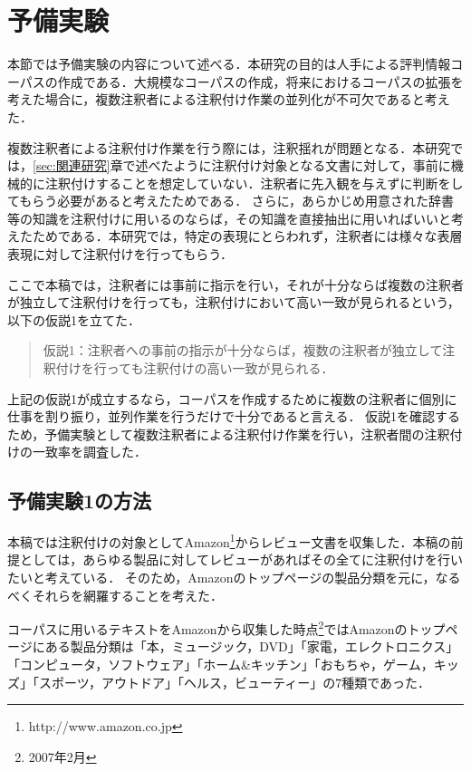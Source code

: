 \documentclass[japanese]{jnlp_1.4}
\begin{document}
\section{予備実験}
\label{sec:予備実験}

本節では予備実験の内容について述べる．本研究の目的は人手による評判情報コーパスの作成である．大規模なコーパスの作成，将来におけるコーパスの拡張を考えた場合に，複数注釈者による注釈付け作業の並列化が不可欠であると考えた．

複数注釈者による注釈付け作業を行う際には，注釈揺れが問題となる．本研究では，\ref{sec:関連研究}章で述べたように注釈付け対象となる文書に対して，事前に機械的に注釈付けすることを想定していない．注釈者に先入観を与えずに判断をしてもらう必要があると考えたためである．
さらに，あらかじめ用意された辞書等の知識を注釈付けに用いるのならば，その知識を直接抽出に用いればいいと考えたためである．本研究では，特定の表現にとらわれず，注釈者には様々な表層表現に対して注釈付けを行ってもらう．

ここで本稿では，注釈者には事前に指示を行い，それが十分ならば複数の注釈者が独立して注釈付けを行っても，注釈付けにおいて高い一致が見られるという，以下の仮説1を立てた．

\vspace*{0.5\baselineskip}
\begin{quote}
仮説1：注釈者への事前の指示が十分ならば，複数の注釈者が独立して注釈付けを行っても注釈付けの高い一致が見られる．
\end{quote}
\vspace*{0.5\baselineskip}

上記の仮説1が成立するなら，コーパスを作成するために複数の注釈者に個別に仕事を割り振り，並列作業を行うだけで十分であると言える．
仮説1を確認するため，予備実験として複数注釈者による注釈付け作業を行い，注釈者間の注釈付けの一致率を調査した．



\subsection{予備実験1の方法}
\label{sec:予備実験1の方法}

本稿では注釈付けの対象としてAmazon\footnote{http://www.amazon.co.jp}からレビュー文書を収集した．本稿の前提としては，あらゆる製品に対してレビューがあればその全てに注釈付けを行いたいと考えている．
そのため，Amazonのトップページの製品分類を元に，なるべくそれらを網羅することを考えた．

コーパスに用いるテキストをAmazonから収集した時点\footnote{2007年2月}ではAmazonのトップページにある製品分類は「本，ミュージック，DVD」「家電，エレクトロニクス」「コンピュータ，ソフトウェア」「ホーム\&キッチン」「おもちゃ，ゲーム，キッズ」「スポーツ，アウトドア」「ヘルス，ビューティー」の7種類であった．
\end{document}
